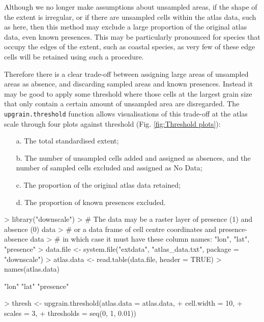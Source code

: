 \documentclass{article}[12pt, a4paper]
\begin{document}
Although we no longer make assumptions about unsampled areas, if the shape of the extent is irregular, or if there are unsampled cells within the atlas data, such as here, then this method may exclude a large proportion of the original atlas data, even known presences. This may be particularly pronounced for species that occupy the edges of the extent, such as coastal species, as very few of these edge cells will be retained using such a procedure.

Therefore there is a clear trade-off between assigning large areas of unsampled areas as absence, and discarding sampled areas and known presences. Instead it may be good to apply some threshold where those cells at the largest grain size that only contain a certain amount of unsampled area are disregarded. The \texttt{upgrain.threshold} function allows visualisations of this trade-off at the atlas scale through four plots against threshold (Fig. \ref{fig:Threshold plots}):

\begin{enumerate} \itemsep1pt \parskip0pt 
\item [a.] The total standardised extent;
\item [b.] The number of unsampled cells added and assigned as absences, and the number of sampled cells excluded and assigned as No Data;
\item [c.] The proportion of the original atlas data retained;
\item [d.] The proportion of known presences excluded.
\end{enumerate}

\begin{Schunk}
\begin{Sinput}
> library("downscale")
> #  The data may be a raster layer of presence (1) and absence (0) data 
> #  or a data frame of cell centre coordinates and presence-absence data 
> #  in which case it must have these column names: "lon", "lat", "presence"
> data.file <- system.file("extdata", "atlas_data.txt", package = "downscale")
> atlas.data <- read.table(data.file, header = TRUE)
> names(atlas.data)
\end{Sinput}
\begin{Soutput}
[1] "lon"      "lat"      "presence"

\end{Soutput}
\begin{Sinput}
> thresh <- upgrain.threshold(atlas.data = atlas.data,
+                             cell.width = 10,
+                             scales = 3,
+                             thresholds = seq(0, 1, 0.01))
\end{Sinput}
\end{Schunk}
\end{document}
